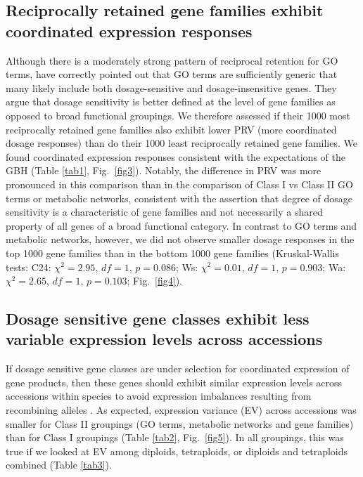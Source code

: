 \documentclass[11pt]{article}
\begin{document}
\subsection*{Reciprocally retained gene families exhibit coordinated expression responses}
Although there is a moderately strong pattern of reciprocal retention for GO terms, \cite{tasdighian2017} have correctly pointed out that GO terms are sufficiently generic that many likely include both dosage-sensitive and dosage-insensitive genes.
They argue that dosage sensitivity is better defined at the level of gene families as opposed to broad functional groupings.
We therefore assessed if their 1000 most reciprocally retained gene families also exhibit lower PRV (more coordinated dosage responses) than do their 1000 least reciprocally retained gene families.
We found coordinated expression responses consistent with the expectations of the GBH (Table \ref{tab1}, Fig.~\ref{fig3}).
Notably, the difference in PRV was more pronounced in this comparison than in the comparison of Class I vs Class II GO terms or metabolic networks, consistent with the \cite{tasdighian2017} assertion that degree of dosage sensitivity is a characteristic of gene families and not necessarily a shared property of all genes of a broad functional category.
In contrast to GO terms and metabolic networks, however, we did not observe smaller dosage responses in the top 1000 gene families than in the bottom 1000 gene families (Kruskal-Wallis tests: C24: $\chi^{2} = 2.95$,  $df = 1$, $p = 0.086$; Ws: $\chi^{2} = 0.01$,  $df = 1$, $p = 0.903$; Wa: $\chi^{2} = 2.65$,  $df = 1$, $p = 0.103$; Fig.~\ref{fig4}).\\

\subsection*{Dosage sensitive gene classes exhibit less variable expression levels across accessions}
If dosage sensitive gene classes are under selection for coordinated expression of gene products, then these genes should exhibit similar expression levels across accessions within species to avoid expression imbalances resulting from recombining alleles \citep{coate2016}.
As expected, expression variance (EV) across accessions was smaller for Class II groupings (GO terms, metabolic networks and gene families) than for Class I groupings (Table \ref{tab2}, Fig.~\ref{fig5}).
In all groupings, this was true if we looked at EV among diploids, tetraploids, or diploids and tetraploids combined (Table \ref{tab3}).\\
\end{document}
